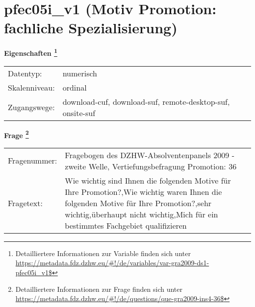 
    \setcounter{footnote}{0}

    \vspace*{-1.8cm}
	\section{pfec05i\_v1 (Motiv Promotion: fachliche Spezialisierung)}
	\label{section:pfec05i_v1}



    \vspace*{0.5cm}
    \noindent\textbf{Eigenschaften
	\footnote{Detailliertere Informationen zur Variable finden sich unter
		\url{https://metadata.fdz.dzhw.eu/\#!/de/variables/var-gra2009-ds1-pfec05i_v1$}}}\\
	\begin{tabularx}{\hsize}{@{}lX}
	Datentyp: & numerisch \\
	Skalenniveau: & ordinal \\
	Zugangswege: &
	  download-cuf, 
	  download-suf, 
	  remote-desktop-suf, 
	  onsite-suf
 \\
    \end{tabularx}



				\vspace*{0.5cm}
                \noindent\textbf{Frage
	                \footnote{Detailliertere Informationen zur Frage finden sich unter
		              \url{https://metadata.fdz.dzhw.eu/\#!/de/questions/que-gra2009-ins4-36$}}}\\
				\begin{tabularx}{\hsize}{@{}lX}
					Fragenummer: &
					  Fragebogen des DZHW-Absolventenpanels 2009 - zweite Welle, Vertiefungsbefragung Promotion:
					  36
 \\
					Fragetext: & Wie wichtig sind Ihnen die folgenden Motive für Ihre Promotion?,Wie wichtig waren Ihnen die folgenden Motive für Ihre Promotion?,sehr wichtig,überhaupt nicht wichtig,Mich für ein bestimmtes Fachgebiet qualifizieren \\
				\end{tabularx}





